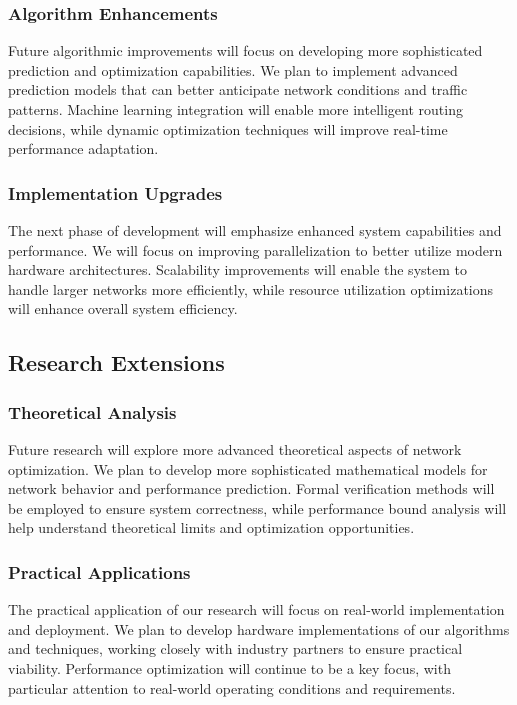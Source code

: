 \documentclass[12pt]{article}
\begin{document}
\subsubsection{Algorithm Enhancements}
Future algorithmic improvements will focus on developing more sophisticated prediction and optimization capabilities. We plan to implement advanced prediction models that can better anticipate network conditions and traffic patterns. Machine learning integration will enable more intelligent routing decisions, while dynamic optimization techniques will improve real-time performance adaptation.

\subsubsection{Implementation Upgrades}
The next phase of development will emphasize enhanced system capabilities and performance. We will focus on improving parallelization to better utilize modern hardware architectures. Scalability improvements will enable the system to handle larger networks more efficiently, while resource utilization optimizations will enhance overall system efficiency.

\subsection{Research Extensions}
\subsubsection{Theoretical Analysis}
Future research will explore more advanced theoretical aspects of network optimization. We plan to develop more sophisticated mathematical models for network behavior and performance prediction. Formal verification methods will be employed to ensure system correctness, while performance bound analysis will help understand theoretical limits and optimization opportunities.

\subsubsection{Practical Applications}
The practical application of our research will focus on real-world implementation and deployment. We plan to develop hardware implementations of our algorithms and techniques, working closely with industry partners to ensure practical viability. Performance optimization will continue to be a key focus, with particular attention to real-world operating conditions and requirements.
\end{document}
